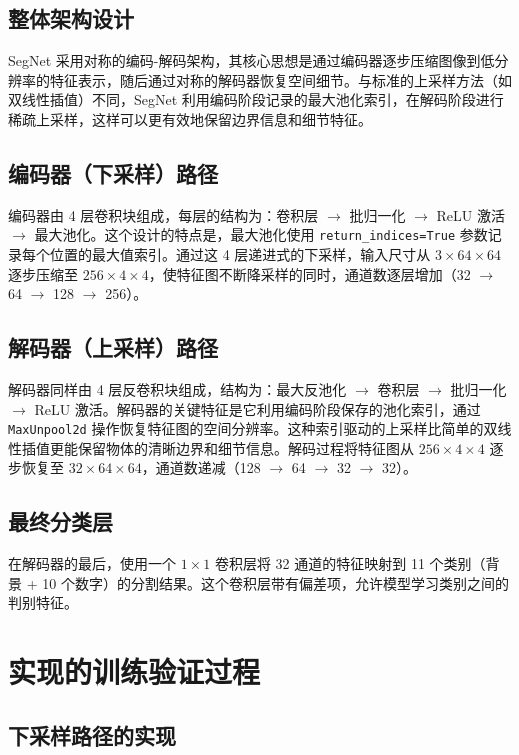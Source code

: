 \documentclass[a4paper]{article}
\begin{document}
\subsection{整体架构设计}

SegNet 采用对称的编码-解码架构，其核心思想是通过编码器逐步压缩图像到低分辨率的特征表示，随后通过对称的解码器恢复空间细节。与标准的上采样方法（如双线性插值）不同，SegNet 利用编码阶段记录的最大池化索引，在解码阶段进行稀疏上采样，这样可以更有效地保留边界信息和细节特征。

\subsection{编码器（下采样）路径}

编码器由 4 层卷积块组成，每层的结构为：卷积层 $\to$ 批归一化 $\to$ ReLU 激活 $\to$ 最大池化。这个设计的特点是，最大池化使用 \texttt{return\_indices=True} 参数记录每个位置的最大值索引。通过这 4 层递进式的下采样，输入尺寸从 $3 \times 64 \times 64$ 逐步压缩至 $256 \times 4 \times 4$，使特征图不断降采样的同时，通道数逐层增加（32 $\to$ 64 $\to$ 128 $\to$ 256）。

\subsection{解码器（上采样）路径}

解码器同样由 4 层反卷积块组成，结构为：最大反池化 $\to$ 卷积层 $\to$ 批归一化 $\to$ ReLU 激活。解码器的关键特征是它利用编码阶段保存的池化索引，通过 \texttt{MaxUnpool2d} 操作恢复特征图的空间分辨率。这种索引驱动的上采样比简单的双线性插值更能保留物体的清晰边界和细节信息。解码过程将特征图从 $256 \times 4 \times 4$ 逐步恢复至 $32 \times 64 \times 64$，通道数递减（128 $\to$ 64 $\to$ 32 $\to$ 32）。

\subsection{最终分类层}

在解码器的最后，使用一个 $1 \times 1$ 卷积层将 32 通道的特征映射到 11 个类别（背景 + 10 个数字）的分割结果。这个卷积层带有偏差项，允许模型学习类别之间的判别特征。

\section{实现的训练验证过程}

\subsection{下采样路径的实现}
\end{document}
